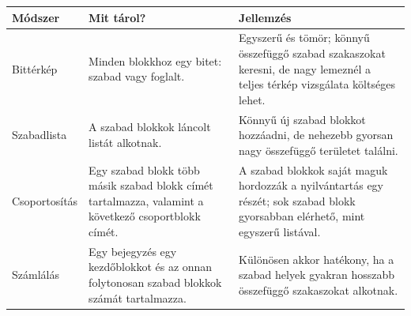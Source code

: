 \begin{tabularx}{\textwidth}{L{28mm}X X}
\toprule
\textbf{Módszer} & \textbf{Mit tárol?} & \textbf{Jellemzés} \\
\midrule
Bittérkép & Minden blokkhoz egy bitet: szabad vagy foglalt. & Egyszerű és tömör; könnyű összefüggő szabad szakaszokat keresni, de nagy lemeznél a teljes térkép vizsgálata költséges lehet. \\
Szabadlista & A szabad blokkok láncolt listát alkotnak. & Könnyű új szabad blokkot hozzáadni, de nehezebb gyorsan nagy összefüggő területet találni. \\
Csoportosítás & Egy szabad blokk több másik szabad blokk címét tartalmazza, valamint a következő csoportblokk címét. & A szabad blokkok saját maguk hordozzák a nyilvántartás egy részét; sok szabad blokk gyorsabban elérhető, mint egyszerű listával. \\
Számlálás & Egy bejegyzés egy kezdőblokkot és az onnan folytonosan szabad blokkok számát tartalmazza. & Különösen akkor hatékony, ha a szabad helyek gyakran hosszabb összefüggő szakaszokat alkotnak. \\
\bottomrule
\end{tabularx}
